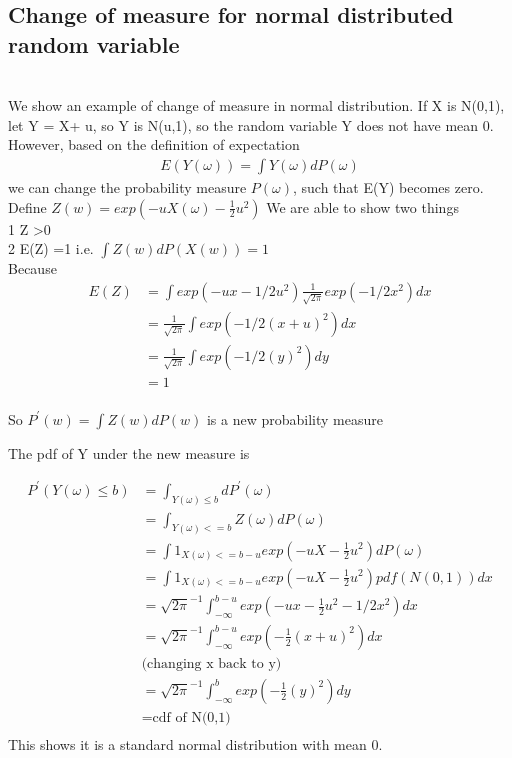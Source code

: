 \documentclass[a4paper]{article}
\begin{document}
\subsection{Change of measure for normal distributed random variable}\\
We show an example of change of measure in normal distribution. If X is N(0,1), let Y = X+ u, so Y is N(u,1), so the random variable Y does not have mean 0. However, based
on the definition of expectation\\
\begin{align*}
	E(Y(\omega)) = \int Y(\omega) dP(\omega)
\end{align*}
we can change the probability measure $P(\omega)$, such that E(Y) becomes zero.
Define $Z(w) = exp(-uX(\omega) - \frac{1}{2}u^2)$
We are able to show two things\\ 
1 Z \textgreater 0 \\
2 E(Z) =1 i.e. $\int Z(w)dP(X(w)) = 1$ \\
Because 
\begin{align*}
E(Z)  & = \int exp(-ux-1/2u^2) \frac{1}{\sqrt{2\pi}} exp(-1/2x^2) dx\\
& = \frac{1}{\sqrt{2\pi}}  \int exp(-1/2(x+u)^2) dx \\
& = \frac{1}{\sqrt{2\pi}}  \int exp(-1/2(y)^2) dy \\
& = 1 \\
\end{align*}

So $P^{'}(w) = \int Z(w) dP(w)$ is a new probability measure

The pdf of Y under the new measure is

\begin{align*}
	P^{'}(Y(\omega) \leq b) & = \int_{Y(\omega) \leq b} d P^{'}(\omega) \\
&= \int_{Y(\omega)<=b} Z(\omega) dP(\omega) \\
&= \int 1_{X(\omega)<=b-u} exp(-uX- \frac{1}{2} u^2 )dP(\omega) \\
&=\int 1_{X(\omega)<=b-u} exp(-uX- \frac{1}{2} u^2 ) pdf(N(0,1)) dx \\
&=  {\sqrt{2\pi}}^{-1} \int_{-\infty}^{b-u} exp(-ux -\frac{1}{2}u^2 -1/2x^2) dx \\
&=  {\sqrt{2\pi}}^{-1}\int_{-\infty}^{b-u} exp(-\frac{1}{2} (x+u)^2) dx \\
&\textrm{(changing x back to y)}\\
&=  {\sqrt{2\pi}}^{-1}\int _{-\infty}^{b} exp(-\frac{1}{2} (y)^2) dy \\
&= \textrm{cdf of N(0,1)} \\
\end{align*}
This shows it is a standard normal distribution with mean 0.\\
\end{document}
